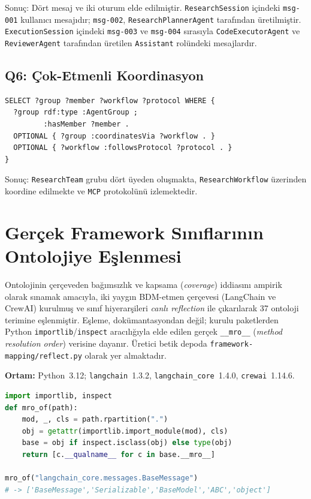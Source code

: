 \documentclass[10pt, a4paper, twocolumn]{article}
\begin{document}
\noindent Sonuç: Dört mesaj ve iki oturum elde edilmiştir. \texttt{ResearchSession} içindeki \texttt{msg-001} kullanıcı mesajıdır; \texttt{msg-002}, \texttt{ResearchPlannerAgent} tarafından üretilmiştir. \texttt{ExecutionSession} içindeki \texttt{msg-003} ve \texttt{msg-004} sırasıyla \texttt{CodeExecutorAgent} ve \texttt{ReviewerAgent} tarafından üretilen \texttt{Assistant} rolündeki mesajlardır.

\subsection*{Q6: Çok-Etmenli Koordinasyon}

\begin{lstlisting}[language=sparql]
SELECT ?group ?member ?workflow ?protocol WHERE {
  ?group rdf:type :AgentGroup ;
         :hasMember ?member .
  OPTIONAL { ?group :coordinatesVia ?workflow . }
  OPTIONAL { ?workflow :followsProtocol ?protocol . }
}
\end{lstlisting}

\noindent Sonuç: \texttt{ResearchTeam} grubu dört üyeden oluşmakta, \texttt{ResearchWorkflow} üzerinden koordine edilmekte ve \texttt{MCP} protokolünü izlemektedir.

\clearpage
\section{Gerçek Framework Sınıflarının Ontolojiye Eşlenmesi}
\label{app:frameworks}

Ontolojinin çerçeveden bağımsızlık ve kapsama (\textit{coverage}) iddiasını ampirik olarak sınamak amacıyla, iki yaygın BDM-etmen çerçevesi (LangChain ve CrewAI) kurulmuş ve sınıf hiyerarşileri \emph{canlı reflection} ile çıkarılarak 37 ontoloji terimine eşlenmiştir. Eşleme, dokümantasyondan değil; kurulu paketlerden Python \texttt{importlib}/\texttt{inspect} aracılığıyla elde edilen gerçek \texttt{\_\_mro\_\_} (\textit{method resolution order}) verisine dayanır. Üretici betik depoda \texttt{framework-mapping/reflect.py} olarak yer almaktadır.

\noindent\textbf{Ortam:} Python~3.12; \texttt{langchain}~1.3.2, \texttt{langchain\_core}~1.4.0, \texttt{crewai}~1.14.6.

\begin{lstlisting}[language=Python]
import importlib, inspect
def mro_of(path):
    mod, _, cls = path.rpartition(".")
    obj = getattr(importlib.import_module(mod), cls)
    base = obj if inspect.isclass(obj) else type(obj)
    return [c.__qualname__ for c in base.__mro__]

mro_of("langchain_core.messages.BaseMessage")
# -> ['BaseMessage','Serializable','BaseModel','ABC','object']
\end{lstlisting}
\end{document}

